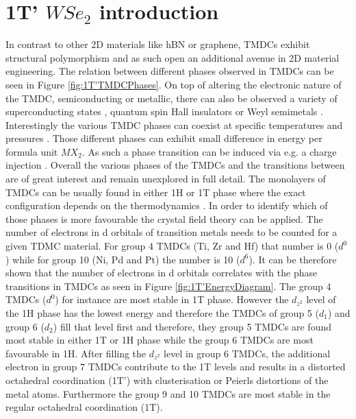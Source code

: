 \chapter{1T' $WSe_2$ introduction}

In contrast to other 2D materials like hBN or graphene, TMDCs exhibit structural polymorphism and as such open an additional avenue in 2D material engineering. The relation between different phases observed in TMDCs can be seen in Figure \ref{fig:1T'TMDCPhases}. On top of altering the electronic nature of the TMDC, semiconducting or metallic, there can also be observed a variety of superconducting states \cite{Saito2015}\cite{Lu2015}, quantum spin Hall insulators \cite{Qian2014}\cite{Choe2016}\cite{Liu2016a}\cite{Fei2017} or Weyl semimetals \cite{Sun2015}. Interestingly the various TMDC phases can coexist at specific temperatures and pressures \cite{Kappera2014}\cite{Keum2015}\cite{Cho2015}. Those different phases can exhibit small difference in energy per formula unit $MX_2$. As such a phase transition can be induced via e.g. a charge injection \cite{Duerloo2014}. Overall the various phases of the TMDCs and the transitions between are of great interest and remain unexplored in full detail.
The monolayers of TMDCs can be usually found in either 1H or 1T phase where the exact configuration depends on the thermodynamics \cite{Keum2015}\cite{Cho2015}. In order to identify which of those phases is more favourable the crystal field theory can be applied. The number of electrons in d orbitals of transition metals needs to be counted for a given TDMC material. For group 4 TMDCs (Ti, Zr and Hf) that number is 0 ($d^0$) while for group 10 (Ni, Pd and Pt) the number is 10 ($d^6$). It can be therefore shown that the number of electrons in d orbitals correlates with the phase transitions in TMDCs as seen in Figure \ref{fig:1T'EnergyDiagram}. The group 4 TMDCs ($d^0$) for instance are most stable in 1T phase. However the $d_{z^2}$ level of the 1H phase has the lowest energy and therefore the TMDCs of group 5 ($d_1$) and group 6 ($d_2$) fill that level first and therefore, they group 5 TMDCs are found most stable in  either 1T or 1H phase while the group 6 TMDCs are most favourable in 1H. After filling the $d_{z^2}$ level in group 6 TMDCs, the additional electron in group 7 TMDCs contribute to the 1T levels and results in a distorted octahedral coordination (1T') with clusterisation or Peierls distortions of the metal atoms. Furthermore the group 9 and 10 TMDCs are most stable in the regular octahedral coordination (1T).


